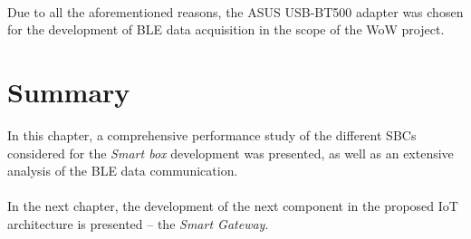 \paragraph{} Due to all the aforementioned reasons, the ASUS USB-BT500 adapter was chosen for the development of \acs{BLE} data acquisition in the scope of the \acs{WoW} project.

\section{Summary}
In this chapter, a comprehensive performance study of the different \acs{SBC}s considered for the \textit{Smart box} development was presented, as well as an extensive analysis of the \acs{BLE} data communication.

\paragraph{} In the next chapter, the development of the next component in the proposed \acs{IoT} architecture is presented -- the \textit{Smart Gateway}.